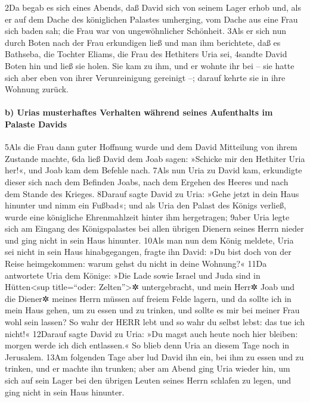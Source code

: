 2Da begab es sich eines Abends, daß David sich von seinem Lager erhob
und, als er auf dem Dache des königlichen Palastes umherging, vom Dache
aus eine Frau sich baden sah; die Frau war von ungewöhnlicher Schönheit.
3Als er sich nun durch Boten nach der Frau erkundigen ließ und man ihm
berichtete, daß es Bathseba, die Tochter Eliams, die Frau des Hethiters
Uria sei, 4sandte David Boten hin und ließ sie holen. Sie kam zu ihm,
und er wohnte ihr bei -- sie hatte sich aber eben von ihrer
Verunreinigung gereinigt --; darauf kehrte sie in ihre Wohnung zurück.

\hypertarget{b-urias-musterhaftes-verhalten-wuxe4hrend-seines-aufenthalts-im-palaste-davids}{%
\paragraph{b) Urias musterhaftes Verhalten während seines Aufenthalts im
Palaste
Davids}\label{b-urias-musterhaftes-verhalten-wuxe4hrend-seines-aufenthalts-im-palaste-davids}}

5Als die Frau dann guter Hoffnung wurde und dem David Mitteilung von
ihrem Zustande machte, 6da ließ David dem Joab sagen: »Schicke mir den
Hethiter Uria her!«, und Joab kam dem Befehle nach. 7Als nun Uria zu
David kam, erkundigte dieser sich nach dem Befinden Joabs, nach dem
Ergehen des Heeres und nach dem Stande des Krieges. 8Darauf sagte David
zu Uria: »Gehe jetzt in dein Haus hinunter und nimm ein Fußbad«; und als
Uria den Palast des Königs verließ, wurde eine königliche Ehrenmahlzeit
hinter ihm hergetragen; 9aber Uria legte sich am Eingang des
Königspalastes bei allen übrigen Dienern seines Herrn nieder und ging
nicht in sein Haus hinunter. 10Als man nun dem König meldete, Uria sei
nicht in sein Haus hinabgegangen, fragte ihn David: »Du bist doch von
der Reise heimgekommen: warum gehst du nicht in deine Wohnung?« 11Da
antwortete Uria dem Könige: »Die Lade sowie Israel und Juda sind in
Hütten\textless sup title=``oder: Zelten''\textgreater✲ untergebracht,
und mein Herr✲ Joab und die Diener✲ meines Herrn müssen auf freiem Felde
lagern, und da sollte ich in mein Haus gehen, um zu essen und zu
trinken, und sollte es mir bei meiner Frau wohl sein lassen? So wahr der
HERR lebt und so wahr du selbst lebst: das tue ich nicht!« 12Darauf
sagte David zu Uria: »Du magst auch heute noch hier bleiben: morgen
werde ich dich entlassen.« So blieb denn Uria an diesem Tage noch in
Jerusalem. 13Am folgenden Tage aber lud David ihn ein, bei ihm zu essen
und zu trinken, und er machte ihn trunken; aber am Abend ging Uria
wieder hin, um sich auf sein Lager bei den übrigen Leuten seines Herrn
schlafen zu legen, und ging nicht in sein Haus hinunter.

